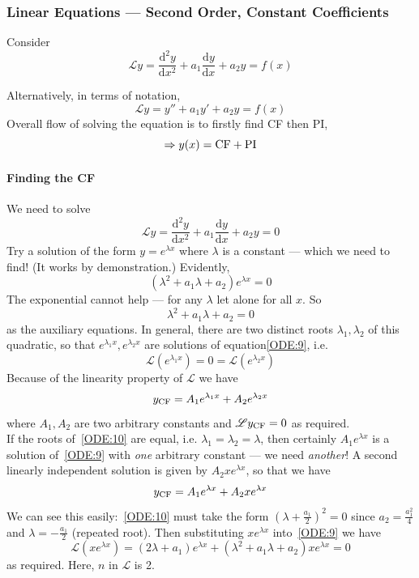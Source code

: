 \documentclass[12pt]{report}
\theoremstyle{definition}
\begin{document}
\subsubsection{Linear Equations --- Second Order, Constant Coefficients}
Consider
\begin{equation}\label{ODE:11}
    \mathscr{L}y = \frac{\mathrm{d}^{2}y}{\mathrm{d}x^{2}} + a_1 \frac{\mathrm{d}y}{\mathrm{d}x}
    + a_2 y = f(x)
\end{equation}

Alternatively, in terms of notation, \[
    \mathscr{L}y = y'' + a_1 y' + a_2 y = f(x)
\]
Overall flow of solving the equation is to firstly find CF then PI, \[
    \Rightarrow y(x) = \textnormal{CF} + \textnormal{PI}
\]

\paragraph{Finding the CF}
We need to solve
\begin{equation}\label{ODE:9}
    \mathscr{L}y = \frac{\mathrm{d}^{2}y}{\mathrm{d}x^{2}} + a_1\frac{\mathrm{d}y}{\mathrm{d}x} + a_2 y = 0
\end{equation}
Try a solution of the form $y = e^{\lambda x}$ where $\lambda$ is a constant --- which we need to find!
(It works by demonstration.) Evidently, \[
    (\lambda^{2} + a_1 \lambda + a_2)e^{\lambda x} = 0
\]The exponential cannot help --- for any $\lambda$ let alone for all $x$. So
\begin{equation}\label{ODE:10}
    \lambda^{2} + a_1 \lambda + a_2 = 0
\end{equation}
as the auxiliary equations. In general, there are two distinct roots $\lambda_1, \lambda_2$
of this quadratic, so that $e^{\lambda_1 x}, e^{\lambda_2 x}$ are solutions of equation\eqref{ODE:9}, i.e.\[
    \mathscr{L}\left(e^{\lambda_1 x}\right) = 0 = \mathscr{L}\left(e^{\lambda_2 x}\right)
\]
Because of the linearity property of $\mathscr{L}$ we have\[
    y_{\textnormal{CF}} = A_1 e^{\lambda_1 x} + A_2 e^{\lambda_2 x}
\]
where $A_1, A_2$ are two arbitrary constants and
$\mathscr{L} y_{\textnormal{CF}} = 0$ as required.
\medskip
\\If the roots of \,\eqref{ODE:10} are equal, i.e. 
$\lambda_1 = \lambda_2 = \lambda$, then certainly $A_1 e^{\lambda x}$
is a solution of \,\eqref{ODE:9} with \emph{one} arbitrary constant --- we need \emph{another}!
A second linearly independent solution is given by $A_2 x e^{\lambda x}$, so that we have\[
    y_{\textnormal{CF}} = A_1 e^{\lambda x} + A_2 x e^{\lambda x}
\]
We can see this easily: \,\eqref{ODE:10} must take the form ${(\lambda + \frac{a_1}{2})}^{2} = 0$
since $a_2 = \frac{a_1^{2}}{4}$ and $\lambda = -\frac{a_1}{2}$ (repeated root).
Then substituting $x e^{\lambda x}$ into \,\eqref{ODE:9} we have\[
    \mathscr{L}\left(x e^{\lambda x}\right)
    = (2 \lambda + a_1) e^{\lambda x} + (\lambda^{2} + a_1 \lambda + a_2) x e^{\lambda x} = 0
\]
as required. Here, $n$ in $\mathscr{L}$ is 2.
\end{document}
